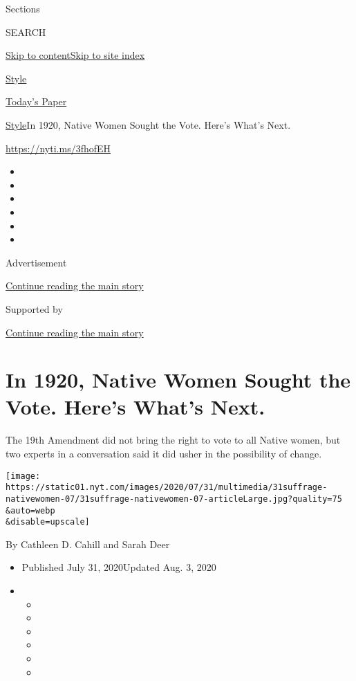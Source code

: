 Sections

SEARCH

\protect\hyperlink{site-content}{Skip to
content}\protect\hyperlink{site-index}{Skip to site index}

\href{https://www.nytimes.com/section/style}{Style}

\href{https://myaccount.nytimes.com/auth/login?response_type=cookie\&client_id=vi}{}

\href{https://www.nytimes.com/section/todayspaper}{Today's Paper}

\href{/section/style}{Style}\textbar{}In 1920, Native Women Sought the
Vote. Here's What's Next.

\url{https://nyti.ms/3fhofEH}

\begin{itemize}
\item
\item
\item
\item
\item
\item
\end{itemize}

Advertisement

\protect\hyperlink{after-top}{Continue reading the main story}

Supported by

\protect\hyperlink{after-sponsor}{Continue reading the main story}

\hypertarget{in-1920-native-women-sought-the-vote-heres-whats-next}{%
\section{In 1920, Native Women Sought the Vote. Here's What's
Next.}\label{in-1920-native-women-sought-the-vote-heres-whats-next}}

The 19th Amendment did not bring the right to vote to all Native women,
but two experts in a conversation said it did usher in the possibility
of change.

\texttt{[image: https://static01.nyt.com/images/2020/07/31/multimedia/31suffrage-nativewomen-07/31suffrage-nativewomen-07-articleLarge.jpg?quality=75\\\&auto=webp\\\&disable=upscale]}

By Cathleen D. Cahill and Sarah Deer

\begin{itemize}
\item
  Published July 31, 2020Updated Aug. 3, 2020
\item
  \begin{itemize}
  \item
  \item
  \item
  \item
  \item
  \item
  \end{itemize}
\end{itemize}


